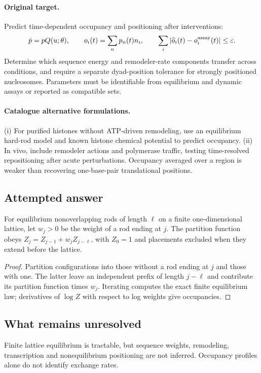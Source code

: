 \documentclass[11pt]{article}
\begin{document}
\paragraph{Original target.}
Predict time-dependent occupancy and positioning after interventions:
\[\dot p=pQ(u;\theta),\qquad o_i(t)=\sum_{n}p_n(t)n_i,\qquad \sum_i|\widehat o_i(t)-o_i^{\rm assay}(t)|\le\varepsilon.\]
Determine which sequence energy and remodeler-rate components transfer across conditions, and require a separate dyad-position tolerance for strongly positioned nucleosomes. Parameters must be identifiable from equilibrium and dynamic assays or reported as compatible sets.
\paragraph{Catalogue alternative formulations.}
(i) For purified histones without ATP-driven remodeling, use an equilibrium hard-rod model and known histone chemical potential to predict occupancy. (ii) In vivo, include remodeler actions and polymerase traffic, testing time-resolved repositioning after acute perturbations. Occupancy averaged over a region is weaker than recovering one-base-pair translational positions.
\subsection{Attempted answer}
\begin{proposition}
For equilibrium nonoverlapping rods of length $\ell$ on a finite one-dimensional lattice, let $w_j>0$ be the weight of a rod ending at $j$. The partition function obeys $Z_j=Z_{j-1}+w_jZ_{j-\ell}$, with $Z_0=1$ and placements excluded when they extend before the lattice.
\end{proposition}
\begin{proof}
Partition configurations into those without a rod ending at $j$ and those with one. The latter leave an independent prefix of length $j-\ell$ and contribute its partition function times $w_j$. Iterating computes the exact finite equilibrium law; derivatives of $\log Z$ with respect to log weights give occupancies.
\end{proof}
\subsection{What remains unresolved}
Finite lattice equilibrium is tractable, but sequence weights, remodeling, transcription and nonequilibrium positioning are not inferred. Occupancy profiles alone do not identify exchange rates.
\end{document}
